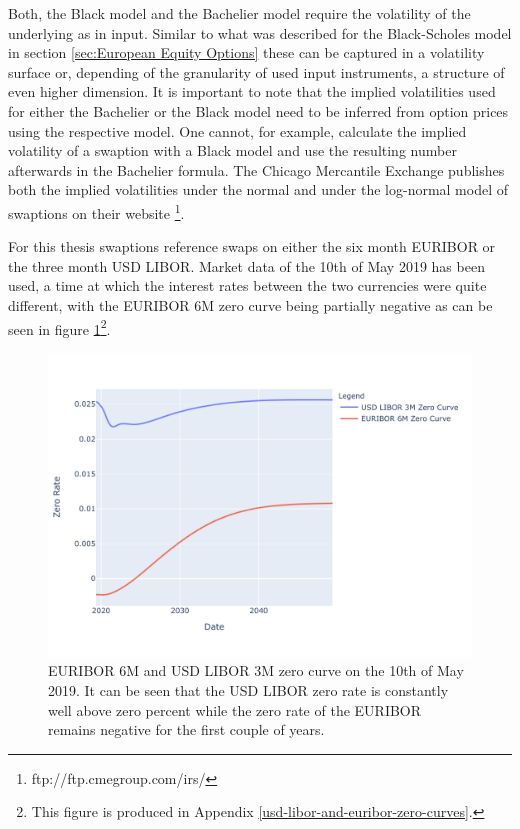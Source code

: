 \documentclass[../Thesis_AHoecherl.tex]{subfiles}
\begin{document}
    Both, the Black model and the Bachelier model require the volatility of the underlying as in input. Similar to what was described for the Black-Scholes model in section \ref{sec:European Equity Options} these can be captured in a volatility surface or, depending of the granularity of used input instruments, a structure of even higher dimension.
    It is important to note that the implied volatilities used for either the Bachelier or the Black model need to be inferred from option prices using the respective model.
    One cannot, for example, calculate the implied volatility of a swaption with a Black model and use the resulting number afterwards in the Bachelier formula.
    The Chicago Mercantile Exchange publishes both the implied volatilities under the normal and under the log-normal model of swaptions on their website
    \footnote{ftp://ftp.cmegroup.com/irs/}.

    For this thesis swaptions reference swaps on either the six month \gls{EURIBOR} or the three month USD \gls{LIBOR}.
    Market data of the 10th of May 2019 has been used, a time at which the interest rates between the two currencies were quite different, with the \gls{EURIBOR} 6M zero curve being partially negative as can be seen in figure \ref{fig:EURIBOR and LIBOR forward curve}\footnote{This figure is produced in Appendix \ref{usd-libor-and-euribor-zero-curves}.}.

    \begin{figure}
        \centering
        \includegraphics{Graphics/EURIBOR_and_LIBOR_curve.pdf}
        \caption[EURIBOR 6M and USD LIBOR 3M zero curve]{\gls{EURIBOR} 6M and USD \gls{LIBOR} 3M zero curve on the 10th of May 2019. It can be seen that the USD \gls{LIBOR} zero rate is constantly well above zero percent while the zero rate of the \gls{EURIBOR} remains negative for the first couple of years.}
        \label{fig:EURIBOR and LIBOR forward curve}
    \end{figure} 
\end{document}
